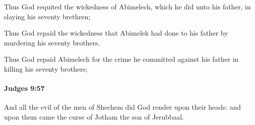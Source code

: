 			\begin{versebox}
					\item[BHS] 
					\item[ASV] Thus God requited the wickedness of Abimelech, which he did unto his father, in slaying his seventy brethren;
					\item[NIV] Thus God repaid the wickedness that Abimelek had done to his father by murdering his seventy brothers.
					\item[NRSV] Thus God repaid Abimelech for the crime he committed against his father in killing his seventy brothers;
			\end{versebox}

		\paragraph{Judges 9:57} %
			\label{JUDGES-9-57}

			And all the evil of the men of Shechem did God render upon their heads: and upon them came the curse of Jotham the son of Jerubbaal.

